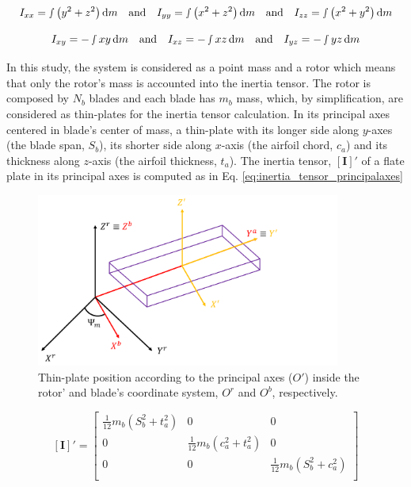 \begin{equation}
    I_{xx} = \smallint  \left( y^2 + z^2 \right) \mathrm{d}m \quad \text{and} \quad I_{yy} = \smallint  \left( x^2 + z^2 \right) \mathrm{d}m \quad \text{and} \quad I_{zz} = \smallint  \left( x^2 + y^2 \right) \mathrm{d}m
    \label{eq:ele_tensor_inertia1}
\end{equation}


\begin{equation}
    I_{xy} = - \smallint  xy \, \mathrm{d}m \quad \text{and} \quad I_{xz} = - \smallint  xz \, \mathrm{d}m \quad \text{and} \quad I_{yz} = - \smallint  yz \, \mathrm{d}m
    \label{eq:ele_tensor_inertia2}
\end{equation}

In this study, the system is considered as a point mass and a rotor which means that only the rotor's mass is accounted into the inertia tensor. The rotor is composed by $N_b$ blades and each blade has $m_b$ mass, which, by simplification, are considered as thin-plates for the inertia tensor calculation. In its principal axes centered in blade's center of mass, a thin-plate with its longer side along $y$-axes (the blade span, $S_b$), its shorter side along $x$-axis (the airfoil chord, $c_a$) and its thickness along $z$-axis (the airfoil thickness, $t_a$). The inertia tensor, $\left[\mathbf{I}\right]'$ of a flate plate in its principal axes is computed as in Eq. \ref{eq:inertia_tensor_principalaxes}

\begin{figure}[!htb]
    \centering
    \includegraphics[width=10cm]{Figures/background/inertia/inertia_scheme.png}
    \caption{Thin-plate position according to the principal axes ($O'$) inside the rotor' and blade's coordinate system, $O^r$ and $O^b$, respectively.}
    \label{fig:Inertia}
\end{figure}

\begin{equation}
    \left[\mathbf{I}\right]' = 
    \begin{bmatrix}
        \frac{1}{12}m_b(S_b^2+t_a^2) & 0 & 0\\
        0 & \frac{1}{12}m_b(c_a^2+t_a^2) & 0\\
        0 & 0 & \frac{1}{12}m_b(S_b^2+c_a^2)\\
    \end{bmatrix}
    \label{eq:inertia_tensor_principalaxes}
\end{equation}

